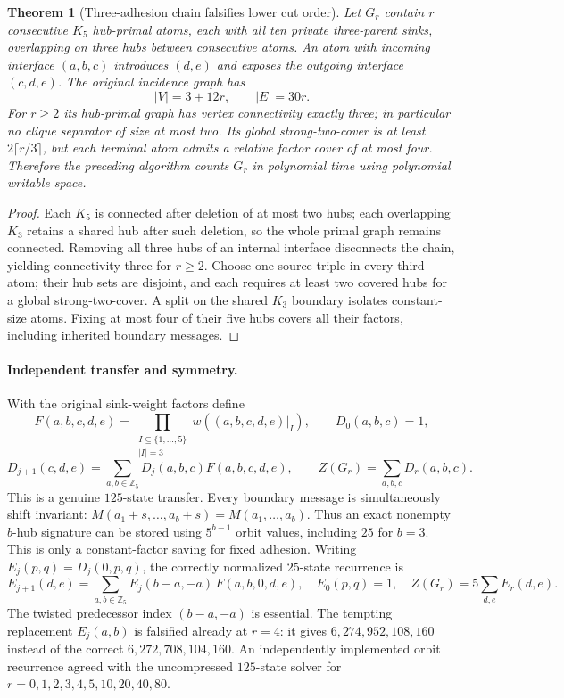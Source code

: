 \documentclass[11pt]{article}
\newtheorem{theorem}{Theorem}
\begin{document}
\begin{theorem}[Three-adhesion chain falsifies lower cut order]
Let $G_r$ contain $r$ consecutive $K_5$ hub-primal atoms,
each with all ten private three-parent sinks, overlapping on
three hubs between consecutive atoms. An atom with incoming
interface $(a,b,c)$ introduces $(d,e)$ and exposes the outgoing
interface $(c,d,e)$. The original incidence graph has
\[
|V|=3+12r,\qquad |E|=30r.
\]
For $r\ge2$ its hub-primal graph has vertex connectivity exactly
three; in particular no clique separator of size at most two.
Its global strong-two-cover is at least $2\lceil r/3\rceil$,
but each terminal atom admits a relative factor cover of at
most four. Therefore the preceding algorithm counts $G_r$
in polynomial time using polynomial writable space.
\end{theorem}
\begin{proof}
Each $K_5$ is connected after deletion of at most two hubs;
each overlapping $K_3$ retains a shared hub after such
deletion, so the whole primal graph remains connected.
Removing all three hubs of an internal interface disconnects
the chain, yielding connectivity three for $r\ge2$.
Choose one source triple in every third atom; their hub
sets are disjoint, and each requires at least two covered
hubs for a global strong-two-cover. A split on the shared
$K_3$ boundary isolates constant-size atoms. Fixing at
most four of their five hubs covers all their factors,
including inherited boundary messages.
\end{proof}

\paragraph{Independent transfer and symmetry.}
With the original sink-weight factors define
\[
F(a,b,c,d,e)=
\prod_{\substack{I\subseteq\{1,\ldots,5\}\\|I|=3}}
w((a,b,c,d,e)|_I),\qquad D_0(a,b,c)=1,
\]
\[
D_{j+1}(c,d,e)=\sum_{a,b\in\mathbb Z_5}
D_j(a,b,c)F(a,b,c,d,e),\qquad
Z(G_r)=\sum_{a,b,c}D_r(a,b,c).
\]
This is a genuine $125$-state transfer. Every boundary message
is simultaneously shift invariant:
$M(a_1+s,\ldots,a_b+s)=M(a_1,\ldots,a_b)$.
Thus an exact nonempty $b$-hub signature can be stored using
$5^{b-1}$ orbit values, including $25$ for $b=3$.
This is only a constant-factor saving for fixed adhesion.
Writing $E_j(p,q)=D_j(0,p,q)$, the correctly normalized
$25$-state recurrence is
\[
E_{j+1}(d,e)=
\sum_{a,b\in\mathbb Z_5}
E_j(b-a,-a)\,F(a,b,0,d,e),
\quad E_0(p,q)=1,
\quad Z(G_r)=5\sum_{d,e}E_r(d,e).
\]
The twisted predecessor index $(b-a,-a)$ is essential.
The tempting replacement $E_j(a,b)$ is falsified already
at $r=4$: it gives $6{,}274{,}952{,}108{,}160$ instead of
the correct $6{,}272{,}708{,}104{,}160$.
An independently implemented orbit recurrence agreed with
the uncompressed $125$-state solver for
$r=0,1,2,3,4,5,10,20,40,80$.
\end{document}
